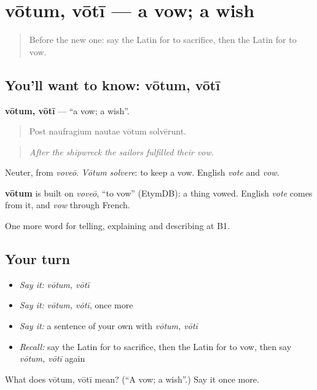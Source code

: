 \section[vōtum, vōtī]{vōtum, vōtī — a vow; a wish}

\label{lesson:LA-C334-votum}



\begin{quote}
Before the new one: say the Latin for to sacrifice, then the Latin for to vow.
\end{quote}

\subsection*{You'll want to know: vōtum, vōtī}
\textbf{vōtum, vōtī} — \textquotedblleft{}a vow; a wish\textquotedblright{}.

\begin{quote}
Post naufragium nautae vōtum solvērunt.
\end{quote}

\begin{quote}
\emph{After the shipwreck the sailors fulfilled their vow.}
\end{quote}

Neuter, from \emph{voveō}. \emph{Vōtum solvere}: to keep a vow. English \emph{vote} and \emph{vow}.

\begin{cousinweb}
\textbf{vōtum} is built on \emph{voveō}, \textquotedblleft{}to vow\textquotedblright{} (EtymDB): a thing vowed. English \emph{vote} comes from it, and \emph{vow} through French.
\end{cousinweb}

\begin{grammarlens}[title={What you've built}]
One more word for telling, explaining and describing at B1.
\end{grammarlens}

\subsection*{Your turn}
\begin{itemize}
\raggedright
  \item \emph{Say it:} \emph{vōtum, vōtī}
  \item \emph{Say it:} \emph{vōtum, vōtī}, once more
  \item \emph{Say it:} a sentence of your own with \emph{vōtum, vōtī}
  \item \emph{Recall:} say the Latin for to sacrifice, then the Latin for to vow, then say \emph{vōtum, vōtī} again
\end{itemize}

\begin{tcolorbox}[breakable,colback=teal!4,colframe=teal!35!black,title={Before you move on}]
What does vōtum, vōtī mean? (\textquotedblleft{}A vow; a wish\textquotedblright{}.) Say it once more.
\end{tcolorbox}

